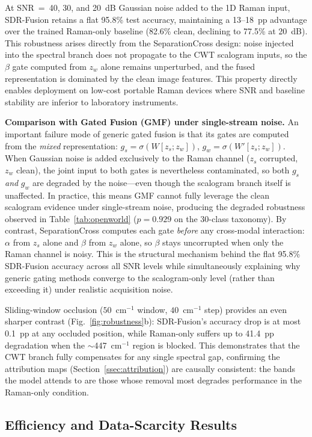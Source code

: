 \documentclass[preprint,12pt]{elsarticle}
\begin{document}
At SNR~=~40, 30, and 20~dB Gaussian noise added to the 1D Raman
input, SDR-Fusion retains a flat 95.8\% test accuracy, maintaining a
13--18~pp advantage over the trained Raman-only baseline (82.6\%
clean, declining to 77.5\% at 20~dB). This robustness arises directly
from the SeparationCross design: noise injected into the spectral
branch does not propagate to the CWT scalogram inputs, so the $\beta$
gate computed from $z_w$ alone remains unperturbed, and the fused
representation is dominated by the clean image features. This property
directly enables deployment on low-cost portable Raman devices where
SNR and baseline stability are inferior to laboratory instruments.

\textbf{Comparison with Gated Fusion (GMF) under single-stream noise.}
An important failure mode of generic gated fusion is that its gates
are computed from the \emph{mixed} representation: $g_s =
\sigma(W[z_s; z_w])$, $g_w = \sigma(W'[z_s; z_w])$.  When Gaussian
noise is added exclusively to the Raman channel ($z_s$ corrupted,
$z_w$ clean), the joint input to both gates is nevertheless
contaminated, so both $g_s$ \emph{and} $g_w$ are degraded by the
noise—even though the scalogram branch itself is unaffected.  In
practice, this means GMF cannot fully leverage the clean scalogram
evidence under single-stream noise, producing the degraded robustness
observed in Table~\ref{tab:openworld} ($p{=}0.929$ on the 30-class
taxonomy).  By contrast, SeparationCross computes each gate
\emph{before} any cross-modal interaction: $\alpha$ from $z_s$
alone and $\beta$ from $z_w$ alone, so $\beta$ stays uncorrupted
when only the Raman channel is noisy.  This is the structural
mechanism behind the flat 95.8\% SDR-Fusion accuracy across all SNR
levels while simultaneously explaining why generic gating methods
converge to the scalogram-only level (rather than exceeding it)
under realistic acquisition noise.

Sliding-window occlusion ($50$~cm$^{-1}$ window, $40$~cm$^{-1}$
step) provides an even sharper contrast
(Fig.~\ref{fig:robustness}b): SDR-Fusion's accuracy drop is at most
0.1~pp at any occluded position, while Raman-only suffers up to
41.4~pp degradation when the $\sim$447~cm$^{-1}$ region is blocked.
This demonstrates that the CWT branch fully compensates for any single
spectral gap, confirming the attribution maps
(Section~\ref{ssec:attribution}) are causally consistent: the bands
the model attends to are those whose removal most degrades performance
in the Raman-only condition.

\subsection{Efficiency and Data-Scarcity Results}
\label{ssec:scarcity_eff}
\end{document}
